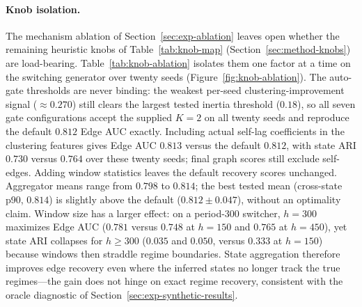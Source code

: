 \documentclass[sigconf,anonymous]{acmart}
\begin{document}
\paragraph{Knob isolation.}
The mechanism ablation of Section~\ref{sec:exp-ablation} leaves open whether the remaining heuristic knobs of Table~\ref{tab:knob-map} (Section~\ref{sec:method-knobs}) are load-bearing.
Table~\ref{tab:knob-ablation} isolates them one factor at a time on the switching generator over twenty seeds (Figure~\ref{fig:knob-ablation}).
The auto-gate thresholds are never binding: the weakest per-seed clustering-improvement signal ($\approx 0.270$) still clears the largest tested inertia threshold ($0.18$), so all seven gate configurations accept the supplied $K{=}2$ on all twenty seeds and reproduce the default $0.812$ Edge AUC exactly.
Including actual self-lag coefficients in the clustering features gives Edge AUC $0.813$ versus the default $0.812$, with state ARI $0.730$ versus $0.764$ over these twenty seeds; final graph scores still exclude self-edges. Adding window statistics leaves the default recovery scores unchanged. Aggregator means range from $0.798$ to $0.814$; the best tested mean (cross-state p90, $0.814$) is slightly above the default ($0.812 \pm 0.047$), without an optimality claim.
Window size has a larger effect: on a period-300 switcher, $h{=}300$ maximizes Edge AUC ($0.781$ versus $0.748$ at $h{=}150$ and $0.765$ at $h{=}450$), yet state ARI collapses for $h \geq 300$ ($0.035$ and $0.050$, versus $0.333$ at $h{=}150$) because windows then straddle regime boundaries.
State aggregation therefore improves edge recovery even where the inferred states no longer track the true regimes---the gain does not hinge on exact regime recovery, consistent with the oracle diagnostic of Section~\ref{sec:exp-synthetic-results}.

\begin{table}[t]
\caption{One-factor-at-a-time isolation of the heuristic knobs of Table~\ref{tab:knob-map} on switching-regime recovery (twenty seeds). Edge AUC is the range of group means; the default configuration reconciles with Table~\ref{tab:all-methods}.}
\label{tab:knob-ablation}
\centering
\small
\resizebox{\linewidth}{!}{}
\end{table}
\end{document}
